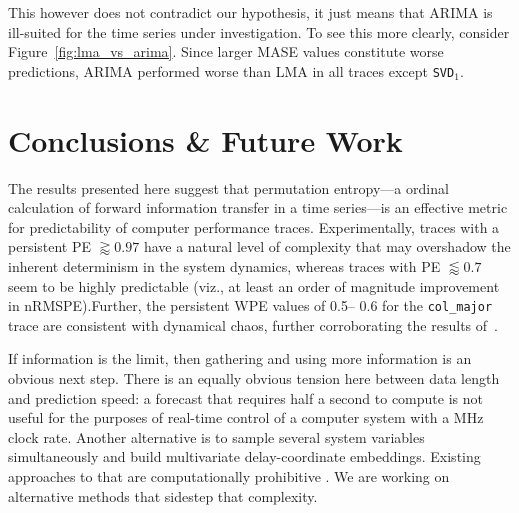 \documentclass{article}
\begin{document}
This however does not contradict our hypothesis,
it just means that ARIMA is ill-suited for the time series under investigation.
To see this more clearly, consider Figure~\ref{fig:lma_vs_arima}. Since larger
MASE values constitute worse predictions, ARIMA performed worse than LMA in all
traces except {\tt SVD$_1$}.












\section{ Conclusions \& Future Work}\label{sec:conc}

The results presented here suggest that permutation entropy---a ordinal
calculation of forward information transfer in a time series---is an effective
metric for predictability of computer performance traces. Experimentally, traces
with a persistent PE $\gtrapprox 0.97$ have a natural level of complexity that
may overshadow the inherent determinism in the system dynamics, whereas traces
with PE $\lessapprox 0.7$ seem to be highly predictable (viz., at least an order
of magnitude improvement in nRMSPE).Further, the persistent WPE values of 0.5--
0.6 for the {\tt col\_major} trace are consistent with dynamical chaos, further
corroborating the results of~\cite{mytkowicz09}.

If information is the limit, then gathering and using more information is an
obvious next step.  There is an equally obvious tension here between data length
and prediction speed: a forecast that requires half a second to compute is not
useful for the purposes of real-time control of a computer system with a MHz
clock rate.  Another alternative is to sample several system variables
simultaneously and build multivariate delay-coordinate embeddings.  Existing
approaches to that are computationally prohibitive
\cite{cao-multivariate-embedding}.  We are working on alternative
methods that sidestep that complexity.
\end{document}
